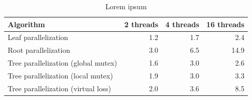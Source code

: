 \begin{table}[h]
\label{tab_parallel_mcts_comparison}
\begin{center}
\begin{tabular}{|l|rrr|}
\hline Algorithm & 2 threads & 4 threads & 16 threads\\
\hline Leaf parallelization & 1.2 & 1.7 & 2.4\\
\hline Root parallelization & 3.0 & 6.5 & 14.9\\
\hline Tree parallelization (global mutex) & 1.6 & 3.0 & 2.6\\
\hline Tree parallelization (local mutex) & 1.9 & 3.0 & 3.3\\
\hline Tree parallelization (virtual loss) & 2.0 & 3.6 & 8.5\\
\hline
\end{tabular}
\end{center}
\caption{\footnotesize Lorem ipsum}{\footnotesize }
\end{table}










